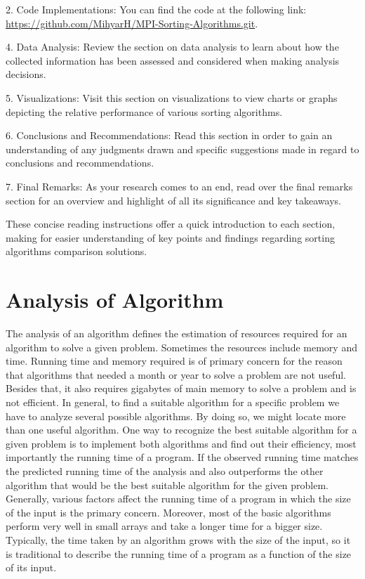 \documentclass{article}
\begin{document}
2. Code Implementations: You can find the code at the following link: \url{https://github.com/MihyarH/MPI-Sorting-Algorithms.git}.

4. Data Analysis: Review the section on data analysis to learn about how the collected information has been assessed and considered when making analysis decisions.

5. Visualizations: Visit this section on visualizations to view charts or graphs depicting the relative performance of various sorting algorithms.

6. Conclusions and Recommendations: Read this section in order to gain an understanding of any judgments drawn and specific suggestions made in regard to conclusions and recommendations.

7. Final Remarks: As your research comes to an end, read over the final remarks section for an overview and highlight of all its significance and key takeaways.

These concise reading instructions offer a quick introduction to each section, making for easier understanding of key points and findings regarding sorting algorithms comparison solutions.

\section{ Analysis of Algorithm}

The analysis of an algorithm defines the estimation of resources required for an
algorithm to solve a given problem. Sometimes the resources include memory and time. Running time and memory required is of
primary concern for the reason that algorithms that needed a month or year to solve
a problem are not useful. Besides that, it also requires gigabytes of main memory to
solve a problem and is not efficient.
In general, to find a suitable algorithm for a
specific problem we have to analyze several possible algorithms. By doing so, we
might locate more than one useful algorithm. One way to recognize the best suitable
algorithm for a given problem is to implement both algorithms and find out their
efficiency, most importantly the running time of a program. If the observed running
time matches the predicted running time of the analysis and also outperforms the
other algorithm that would be the best suitable algorithm for the given problem.
Generally, various factors affect the running time of a program in which the size of
the input is the primary concern. Moreover, most of the basic algorithms perform very
well in small arrays and take a longer time for a bigger size. Typically, the time taken
by an algorithm grows with the size of the input, so it is traditional to describe the
running time of a program as a function of the size of its input. \cite{karunanithi2014survey}
\end{document}
